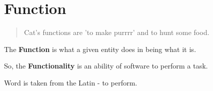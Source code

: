 \section{Function}
\label{sec:Function}

\begin{quote}
 Cat's functions are 'to make purrrr' and to hunt some food.
\end{quote} 

The \textbf{Function} is what a given entity does in being what it is.

So, the \textbf{Functionality} is an ability of software to perform a task.

Word is taken from the Latin  - to perform.
